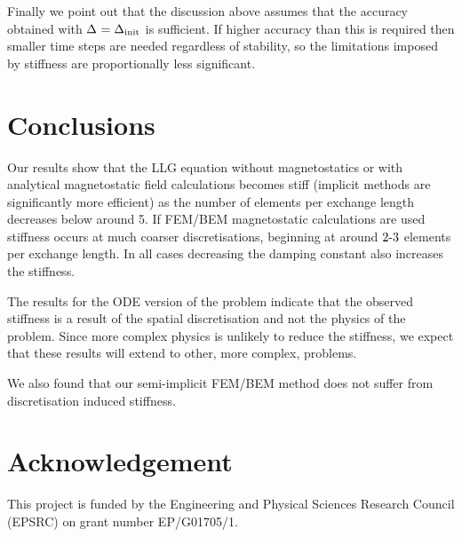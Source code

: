 \documentclass[10pt, final, conference, transmag]{IEEEtran}
\begin{document}
Finally we point out that the discussion above assumes that the accuracy obtained with $\Delta_{} = \Delta_{\text{init}}$ is sufficient.
If higher accuracy than this is required then smaller time steps are needed regardless of stability, so the limitations imposed by stiffness are proportionally less significant.


\section{Conclusions}
Our results show that the LLG equation without magnetostatics or with analytical magnetostatic field calculations becomes stiff (\ie implicit methods are significantly more efficient) as the number of elements per exchange length decreases below around 5.
If FEM/BEM magnetostatic calculations are used stiffness occurs at much coarser discretisations, beginning at around $2\text{-} 3$ elements per exchange length.
In all cases decreasing the damping constant also increases the stiffness.

The results for the ODE version of the problem indicate that the observed stiffness is a result of the spatial discretisation and not the physics of the problem.
Since more complex physics is unlikely to reduce the stiffness, we expect that these results will extend to other, more complex, problems.

We also found that our semi-implicit FEM/BEM method does not suffer from discretisation induced stiffness.

\iftransmagpaper

\section*{Acknowledgement}
This project is funded by the Engineering and Physical Sciences Research Council (EPSRC) on grant number EP/G01705/1.



\end{document}
